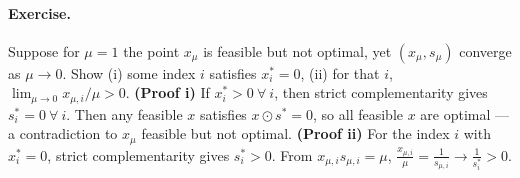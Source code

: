 \documentclass{article}
\begin{document}
\paragraph{Exercise.}
Suppose for $\mu=1$ the point $x_\mu$ is feasible but not optimal, yet $(x_\mu,s_\mu)$ converge as $\mu\to0$. Show  
(i) some index $i$ satisfies $x_i^*=0$,  
(ii) for that $i$, $\lim_{\mu\to0} x_{\mu,i}/\mu >0$.
\textbf{(Proof i)}  
If $x_i^*>0\ \forall\ i$, then strict complementarity gives $s_i^*=0\ \forall\ i$.  
Then any feasible $x$ satisfies $x\odot s^*=0$, so all feasible $x$ are optimal — a contradiction to $x_\mu$ feasible but not optimal.
\textbf{(Proof ii)}  
For the index $i$ with $x_i^*=0$, strict complementarity gives $s_i^*>0$.  
From $x_{\mu,i}s_{\mu,i}=\mu$, $\frac{x_{\mu,i}}{\mu} = \frac{1}{s_{\mu,i}} \to \frac{1}{s_i^*} >0$.
\end{document}
